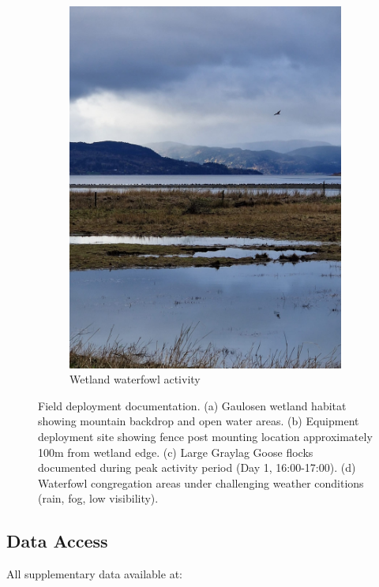 \documentclass[twocolumn]{article}
\begin{document}
\begin{figure}[H]
\begin{subfigure}{0.45\textwidth}
\includegraphics[width=\textwidth]{07_wetland_waterfowl_dramatic.jpg}
\caption{Wetland waterfowl activity}
\end{subfigure}

\caption{Field deployment documentation. (a) Gaulosen wetland habitat showing mountain backdrop and open water areas. (b) Equipment deployment site showing fence post mounting location approximately 100m from wetland edge. (c) Large Graylag Goose flocks documented during peak activity period (Day 1, 16:00-17:00). (d) Waterfowl congregation areas under challenging weather conditions (rain, fog, low visibility).}
\label{fig:field_photos}
\end{figure}

\subsection{Data Access}

All supplementary data available at:
\end{document}
